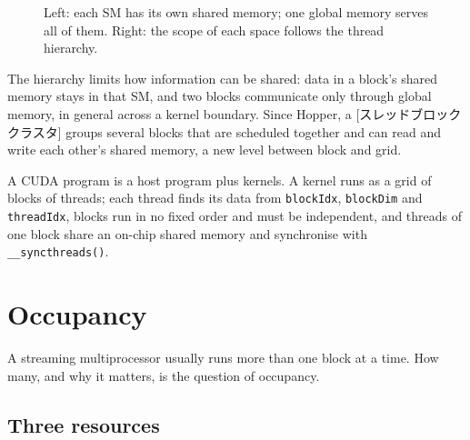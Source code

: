 \documentclass[../main.tex]{subfiles}
\begin{document}
\begin{figure}[tb]
  \centering
  
  \caption{Left: each SM has its own shared memory; one global memory
    serves all of them.  Right: the scope of each space follows the
    thread hierarchy.}
  \label{fig:l03-memory-spaces}
\end{figure}

The hierarchy limits how information can be shared: data in a block's
shared memory stays in that SM, and two blocks communicate only through
global memory, in general across a kernel boundary.  Since Hopper, a
[スレッドブロッククラスタ] groups several
blocks that are scheduled together and can read and write each other's
shared memory, a new level between block and grid.

\begin{keypoint}
  A CUDA program is a host program plus kernels.  A kernel runs as a
  grid of blocks of threads; each thread finds its data from
  \texttt{blockIdx}, \texttt{blockDim} and \texttt{threadIdx}, blocks
  run in no fixed order and must be independent, and threads of one
  block share an on-chip shared memory and synchronise with
  \texttt{\_\_syncthreads()}.
\end{keypoint}

\section{Occupancy}
\label{sec:l03-occupancy}

A streaming multiprocessor usually runs more than one block at a time.
How many, and why it matters, is the question of
occupancy.

\subsection{Three resources}
\end{document}

